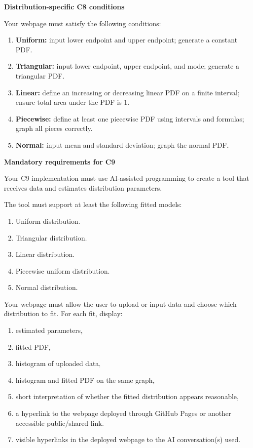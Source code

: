 \documentclass[12pt]{article}
\newcommand{\SubsectionBox}[1]{%
	\noindent\colorbox{gray!30}{%
		\parbox{\linewidth}{\textbf{#1}}%
	}\par\vspace{0.35cm}%
}
\begin{document}
	\SubsectionBox{Distribution-specific C8 conditions}
	Your webpage must satisfy the following conditions:
	\begin{enumerate}
		\item \textbf{Uniform:} input lower endpoint and upper endpoint; generate a constant PDF.
		\item \textbf{Triangular:} input lower endpoint, upper endpoint, and mode; generate a triangular PDF.
		\item \textbf{Linear:} define an increasing or decreasing linear PDF on a finite interval; ensure total area under the PDF is \(1\).
		\item \textbf{Piecewise:} define at least one piecewise PDF using intervals and formulas; graph all pieces correctly.
		\item \textbf{Normal:} input mean and standard deviation; graph the normal PDF.
	\end{enumerate}
	
	\SubsectionBox{Mandatory requirements for C9}
	Your C9 implementation must use AI-assisted programming to create a tool that receives data and estimates distribution parameters.
	
	The tool must support at least the following fitted models:
	\begin{enumerate}
		\item Uniform distribution.
		\item Triangular distribution.
		\item Linear distribution.
		\item Piecewise uniform distribution.
		\item Normal distribution.
	\end{enumerate}
	
	Your webpage must allow the user to upload or input data and choose which distribution to fit. For each fit, display:
	\begin{enumerate}
		\item estimated parameters,
		\item fitted PDF,
		\item histogram of uploaded data,
		\item histogram and fitted PDF on the same graph,
		\item short interpretation of whether the fitted distribution appears reasonable,
		\item a hyperlink to the webpage deployed through GitHub Pages or another accessible public/shared link.
		\item visible hyperlinks in the deployed webpage to the AI conversation(s) used.
	\end{enumerate}
	
\end{document}
